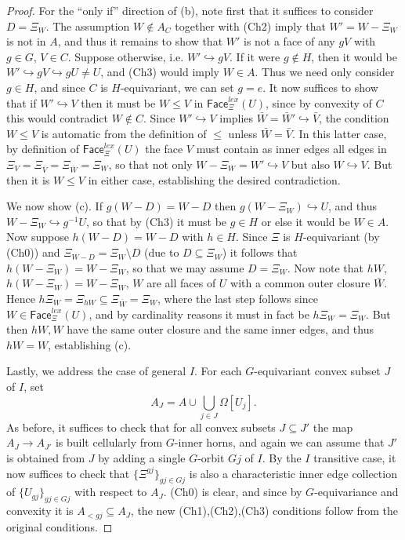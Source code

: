 \documentclass[a4paper,10pt
]{article}%
\begin{document}
\begin{proof}
For the ``only if'' direction of (b), 
note first that it suffices to consider $D = \Xi_W$.
The assumption $W \not \in A_C$ together with (Ch2) imply that
$W'=W-\Xi_{W}$ is not in $A$, and thus it remains to show that 
$W'$ is not a face of any $gV$ with $g\in G$, $V \in C$.
Suppose otherwise, i.e. $W' \hookrightarrow gV$.
If it were $g \not \in H$, 
then it would be $W' \hookrightarrow gV \hookrightarrow g U \neq U$, and (Ch3) would imply $W\in A$. Thus we need only consider $g\in H$, and since $C$ is $H$-equivariant, we can set $g=e$.
It now suffices to show that if $W' \hookrightarrow V$
then it must be $W \leq V$ in $\mathsf{Face}_{\Xi}^{lex}(U)$,
since by convexity of $C$ this would contradict $W \not \in C$.
Since $W' \hookrightarrow V$ implies 
$\bar{W} = \bar{W}' \hookrightarrow \bar{V}$,
the condition $W \leq V$ is automatic from the definition of $\leq$ unless $\bar{W} = \bar{V}$.
In this latter case, by definition of 
$\mathsf{Face}_{\Xi}^{lex}(U)$ the face $V$ must contain as inner edges all edges in 
$\Xi_V = \Xi_{\bar{V}} = \Xi_{\bar{W}} = \Xi_{W}$,
so that not only $W - \Xi_{W} = W' \hookrightarrow V$ but also $W \hookrightarrow V$. But then it is $W \leq V$ in either case, establishing the desired contradiction. 

We now show (c).
If $g(W-D) = W-D$ then $g(W - \Xi_W) \hookrightarrow U$,
and thus $W - \Xi_W \hookrightarrow g^{-1}U$,
so that by (Ch3) it must be $g \in H$ or else it would be $W \in A$.
Now suppose $h(W-D)=W-D$ with $h\in H$.
Since $\Xi$ is $H$-equivariant (by (Ch0)) and
$\Xi_{W-D} = \Xi_{W} \setminus D$ (due to $D \subseteq \Xi_{W}$) it follows that 
$h(W-\Xi_W) = W-\Xi_W$,
so that we may assume $D = \Xi_W$.
Now note that
$hW$, $h(W-\Xi_W)=W-\Xi_W$, $W$
are all faces of $U$ with a common outer closure $\bar{W}$.
Hence
$h\Xi_{W} = \Xi_{hW} \subseteq \Xi_{\bar{W}} = \Xi_{W}$, where the last step follows since
$W \in \mathsf{Face}_{\Xi}^{lex}(U)$, and by cardinality reasons it must in fact be $h \Xi_{W} = \Xi_{W}$. But then $hW,W$
have the same outer closure and the same inner edges, and thus 
$hW=W$, establishing (c).

Lastly, we address the case of general $I$.
For each $G$-equivariant convex subset $J$ of $I$, set
\[
	A_J = 
	A \cup \bigcup_{j \in J} \Omega[U_j].
\]
As before, it suffices to check that for all convex subsets
$J \subseteq J'$
the map $A_J \to A_{J'}$ is built cellularly from $G$-inner horns,
and again we can assume that $J'$ is obtained from $J$ by adding a single $G$-orbit $Gj$ of $I$.
By the $I$ transitive case, it now suffices to check that
$\{\Xi^{gj}\}_{gj \in Gj}$ is also a characteristic inner edge collection of $\{U_{g j}\}_{g j \in Gj}$ with respect to $A_J$.
(Ch0) is clear, and since by $G$-equivariance and convexity it is $A_{<gj} \subseteq A_J$,
the new (Ch1),(Ch2),(Ch3)
conditions follow from the original conditions.
\end{proof}
\end{document}
